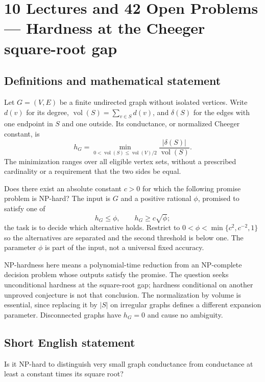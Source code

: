 \documentclass[11pt,a4paper]{article}
\begin{document}
\section*{10 Lectures and 42 Open Problems — Hardness at the Cheeger square-root gap}\label{statement}

\subsection{Definitions and mathematical statement}
Let $G=(V,E)$ be a finite undirected graph without isolated vertices.
Write $d(v)$ for its degree, $\operatorname{vol}(S)=\sum_{v\in S}d(v)$,
and $\delta(S)$ for the edges with one endpoint in $S$ and one outside.
Its conductance, or normalized Cheeger constant, is
\[
 h_G=\min_{0<\operatorname{vol}(S)\le\operatorname{vol}(V)/2}
                   \frac{|\delta(S)|}{\operatorname{vol}(S)}.
\]
The minimization ranges over all eligible vertex sets, without a
prescribed cardinality or a requirement that the two sides be equal.

Does there exist an absolute constant $c>0$ for which the following
promise problem is NP-hard? The input is $G$ and a positive rational
$\phi$, promised to satisfy one of
\[
                 h_G\le\phi,
                 \qquad h_G\ge c\sqrt\phi;
\]
the task is to decide which alternative holds. Restrict to
$0<\phi<\min\{c^2,c^{-2},1\}$ so the alternatives are separated and
the second threshold is below one. The parameter $\phi$ is part of
the input, not a universal fixed accuracy.

NP-hardness here means a polynomial-time reduction from an NP-complete
decision problem whose outputs satisfy the promise. The question seeks
unconditional hardness at the square-root gap; hardness conditional
on another unproved conjecture is not that conclusion. The normalization
by volume is essential, since replacing it by $|S|$ on irregular graphs
defines a different expansion parameter. Disconnected graphs have
$h_G=0$ and cause no ambiguity.
\subsection{Short English statement}
Is it NP-hard to distinguish very small graph conductance from conductance at least a constant times its square root?
\end{document}
